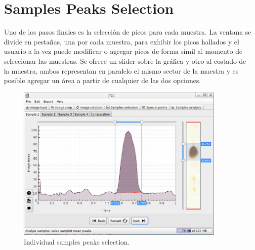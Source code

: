 \section{Samples Peaks Selection}
Uno de los pasos finales es la selecci\'on de picos para cada muestra. La ventana se divide en pesta\~nas, una por cada muestra, para exhibir los picos hallados y el usuario a la vez puede modificar o agregar picos de forma s\'imil al momento de seleccionar las muestras. Se ofrece un slider sobre la gráfica y otro al costado de la muestra, ambos representan en paralelo el mismo sector de la muestra y es posible agregar un \'area a partir de cualquier de las dos opciones.
\begin{figure}[H]
	\vspace{0cm}
	\centering
	\includegraphics[width=385px]{imagenes/analysis}
	\centering
	\vspace{-0.4cm}
	\caption{Individual samples peaks selection.}
	\label{fig:image_samples_peaks}
	\vspace{-0.25cm}
\end{figure}

